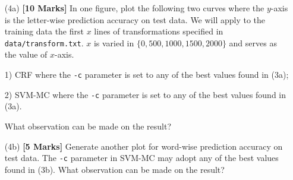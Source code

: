\documentclass[11pt]{report}
\begin{document}
	\begin{itemize}
		\item[(4a)] {\bf [10 Marks]} In one figure, plot the following two curves where the $y$-axis is the letter-wise prediction accuracy on test data.  We will apply to the training data the first $x$ lines of transformations specified in \verb#data/transform.txt#.  $x$ is varied in $\{0, 500, 1000, 1500, 2000\}$ and serves as the value of $x$-axis.
		
		1) CRF where the \verb#-c# parameter is set to any of the best values found in (3a);
		
		2) SVM-MC where the \verb#-c# parameter is set to any of the best values found in (3a).
		
		What observation can be made on the result?
		
		\item[(4b)] {\bf [5 Marks]}  Generate another plot for word-wise prediction accuracy on test data.  The \verb#-c# parameter in SVM-MC may adopt any of the best values found in (3b).
		What observation can be made on the result?
		
	\end{itemize}
	
\end{document}

